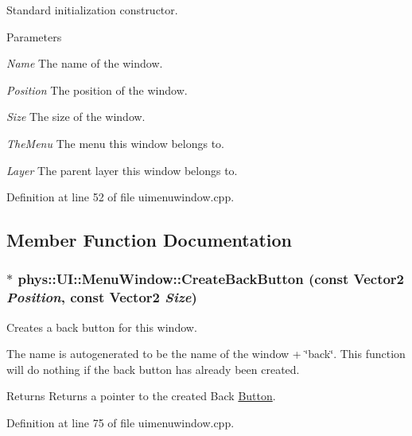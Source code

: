 Standard initialization constructor. 


\begin{DoxyParams}{Parameters}
\item[{\em Name}]The name of the window. \item[{\em Position}]The position of the window. \item[{\em Size}]The size of the window. \item[{\em TheMenu}]The menu this window belongs to. \item[{\em Layer}]The parent layer this window belongs to. \end{DoxyParams}


Definition at line 52 of file uimenuwindow.cpp.



\subsection{Member Function Documentation}
\hypertarget{classphys_1_1UI_1_1MenuWindow_acb16433bca03c75b71ddb74d8df5b5ab}{
\subsubsection[{CreateBackButton}]{ $\ast$ phys::UI::MenuWindow::CreateBackButton (const {\bf Vector2} {\em Position}, \/  const {\bf Vector2} {\em Size})}}
\label{d4/d07/classphys_1_1UI_1_1MenuWindow_acb16433bca03c75b71ddb74d8df5b5ab}


Creates a back button for this window. 

The name is autogenerated to be the name of the window + \char`\"{}back\char`\"{}. This function will do nothing if the back button has already been created. \begin{DoxyReturn}{Returns}
Returns a pointer to the created Back \hyperlink{classphys_1_1UI_1_1Button}{Button}. 
\end{DoxyReturn}


Definition at line 75 of file uimenuwindow.cpp.

